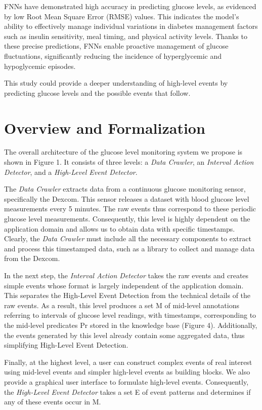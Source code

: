 \documentclass{article}
\begin{document}
FNNs have demonstrated high accuracy in predicting glucose levels, as evidenced by low Root Mean Square Error (RMSE) values. This indicates the model's ability to effectively manage individual variations in diabetes management factors such as insulin sensitivity, meal timing, and physical activity levels. Thanks to these precise predictions, FNNs enable proactive management of glucose fluctuations, significantly reducing the incidence of hyperglycemic and hypoglycemic episodes.

This study could provide a deeper understanding of high-level events by predicting glucose levels and the possible events that follow.



\section{Overview and Formalization}

The overall architecture of the glucose level monitoring system we propose is shown in Figure 1. It consists of three levels: a \textit{Data Crawler}, an \textit{Interval Action Detector}, and a \textit{High-Level Event Detector}.

The \textit{Data Crawler} extracts data from a continuous glucose monitoring sensor, specifically the Dexcom. This sensor releases a dataset with blood glucose level measurements every 5 minutes. The raw events thus correspond to these periodic glucose level measurements. Consequently, this level is highly dependent on the application domain and allows us to obtain data with specific timestamps. Clearly, the \textit{Data Crawler} must include all the necessary components to extract and process this timestamped data, such as a library to collect and manage data from the Dexcom.

In the next step, the \textit{Interval Action Detector} takes the raw events and creates simple events whose format is largely independent of the application domain. This separates the High-Level Event Detection from the technical details of the raw events. As a result, this level produces a set M of mid-level annotations referring to intervals of glucose level readings, with timestamps, corresponding to the mid-level predicates Pr stored in the knowledge base (Figure 4). Additionally, the events generated by this level already contain some aggregated data, thus simplifying High-Level Event Detection.

Finally, at the highest level, a user can construct complex events of real interest using mid-level events and simpler high-level events as building blocks. We also provide a graphical user interface to formulate high-level events. Consequently, the \textit{High-Level Event Detector} takes a set E of event patterns and determines if any of these events occur in M.
\end{document}
